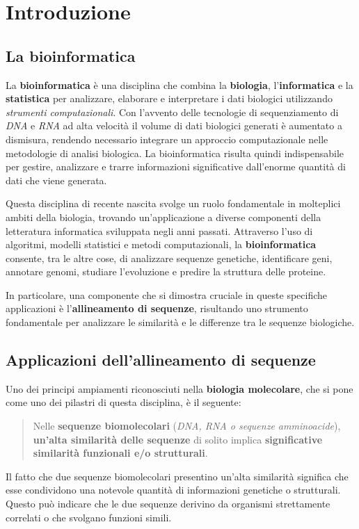 \chapter{Introduzione}
\section{La bioinformatica}
    La \textbf{bioinformatica} è una disciplina che combina la \textbf{biologia}, l'\textbf{informatica} e la \textbf{statistica} per analizzare, elaborare e interpretare i dati biologici utilizzando \emph{strumenti computazionali}. Con l'avvento delle tecnologie di sequenziamento di \emph{DNA} e \emph{RNA} ad alta velocità il volume di dati biologici generati è aumentato a dismisura, rendendo necessario integrare un approccio computazionale nelle metodologie di analisi biologica. La bioinformatica risulta quindi indispensabile per gestire, analizzare e trarre informazioni significative dall'enorme quantità di dati che viene generata.
    
    Questa disciplina di recente nascita svolge un ruolo fondamentale in molteplici ambiti della biologia, trovando un'applicazione a diverse componenti della letteratura informatica sviluppata negli anni passati. Attraverso l'uso di algoritmi, modelli statistici e metodi computazionali, la \textbf{bioinformatica} consente, tra le altre cose, di analizzare sequenze genetiche, identificare geni, annotare genomi, studiare l'evoluzione e predire la struttura delle proteine.
    
    In particolare, una componente che si dimostra cruciale in queste specifiche applicazioni è l'\textbf{allineamento di sequenze}, risultando uno strumento fondamentale per analizzare le similarità e le differenze tra le sequenze biologiche.

\section{Applicazioni dell'allineamento di sequenze}
    Uno dei principi ampiamenti riconosciuti nella \textbf{biologia molecolare}, che si pone come uno dei pilastri di questa disciplina, è il seguente:
    \begin{quote}
         Nelle \textbf{sequenze biomolecolari} (\emph{DNA, RNA o sequenze amminoacide}), \textbf{un'alta similarità delle sequenze} di solito implica \textbf{significative similarità funzionali e/o strutturali}. \cite{Gusfield}
    \end{quote}
    Il fatto che due sequenze biomolecolari presentino un'alta similarità significa che esse condividono una notevole quantità di informazioni genetiche o strutturali. Questo può indicare che le due sequenze derivino da organismi strettamente correlati o che svolgano funzioni simili.

